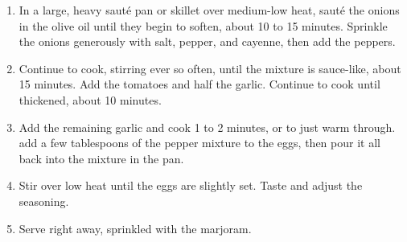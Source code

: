 
\begin{ingredients}
\end{ingredients}


\begin{recipe}
  \begin{enumerate}
  \item In a large, heavy saut\'e pan or skillet over medium-low heat,
  saut\'e the onions in the olive oil until they begin to soften,
  about 10 to 15 minutes.  Sprinkle the onions generously with salt,
  pepper, and cayenne, then add the peppers.

\item Continue to cook, stirring ever so often, until the mixture is
  sauce-like, about 15 minutes.  Add the tomatoes and half the garlic.
  Continue to cook until thickened, about 10 minutes.

\item Add the remaining garlic and cook 1 to 2 minutes, or to just
  warm through.  add a few tablespoons of the pepper mixture to the
  eggs, then pour it all back into the mixture in the pan.

\item Stir over low heat until the eggs are slightly set.  Taste and
  adjust the seasoning.

\item Serve right away, sprinkled with the marjoram.

  \end{enumerate}
\end{recipe}

